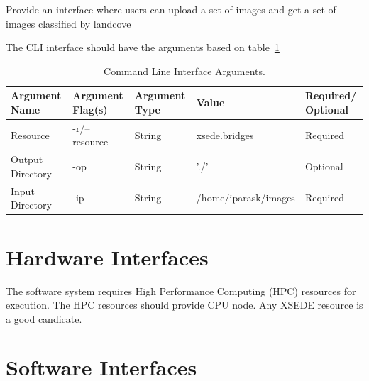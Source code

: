\documentclass{scrreprt}
\begin{document}
Provide an interface where users can upload a set of images and get a set of images
classified by landcove

The CLI interface should have the arguments based on table~\ref{tab:cli_interface}

\begin{table}[ht]
	\centering
	\begin{tabular}{|p{2.5cm}|p{2.2cm}|p{1.8cm}|p{4cm}|p{2cm}|}
		\hline
		Argument Name    & Argument Flag(s) & Argument Type & Value & Required/ Optional\\\hline
		Resource         & -r/--resource    & String        & xsede.bridges & Required\\\hline
		Output Directory & -op              & String        & './'    & Optional\\\hline
		Input Directory  & -ip              & String        & /home/iparask/images & Required\\\hline
	\end{tabular}
	\caption{Command Line Interface Arguments.\label{tab:cli_interface}}
\end{table}

\section{Hardware Interfaces}

The software system requires High Performance Computing (HPC) resources for execution.
The HPC resources should provide CPU node. Any XSEDE resource is a good candicate.

\section{Software Interfaces}

\end{document}
